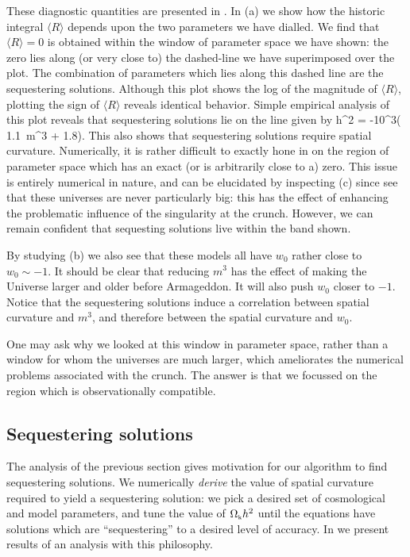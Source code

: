 \documentclass[amsmath,amssymb,10pt,twocolumn,eqsecnum]{revtex4}
\begin{document}
These diagnostic quantities are presented in . In (a) we show how the historic integral $\langle R\rangle$ depends upon the two parameters we have dialled. We find that $\langle R\rangle=0$ is obtained within the window of parameter space we have shown: the zero lies along (or very close to) the dashed-line we have superimposed over the plot. The combination of parameters which lies along this dashed line  are the sequestering solutions. Although this plot shows the log of the magnitude of $\langle R\rangle$, plotting the sign of $\langle R\rangle$ reveals identical behavior. Simple empirical analysis of this plot reveals that sequestering solutions lie on the line given by
\bea
{}h^2 = -10^3\left( 1.1\, m^3 + 1.8\right).
\eea
This also shows that sequestering solutions require spatial curvature. Numerically, it is rather difficult to exactly hone in on the region of parameter space which has an exact (or is arbitrarily close to a) zero. This issue is entirely numerical in nature, and can be elucidated by inspecting (c) since see that  these universes are never particularly big: this has the effect of enhancing the problematic influence of the singularity at the crunch. However, we can remain confident that sequesting solutions live within the band shown. 

By studying (b) we also see that these models all have $w_0$ rather close to $w_0 \sim -1$. It should be clear that reducing $m^3$ has the effect of making the Universe larger and older before Armageddon. It will also push $w_0$ closer to $-1$. Notice that the sequestering solutions induce a correlation between spatial curvature and $m^3$, and therefore between the spatial curvature and $w_0$.

One   may ask why we looked at this window in parameter space, rather than a window for whom the universes are much larger, which ameliorates the numerical problems associated with the crunch. The answer is that we focussed on the region which is observationally compatible.   
 
\subsection{Sequestering solutions}
The analysis of the previous section gives motivation for our algorithm to find sequestering solutions. We numerically \textit{derive} the value of spatial curvature required to yield a sequestering solution: we pick a desired set of cosmological and model parameters, and tune the value of ${\Omega}_{\scriptscriptstyle{\textrm{k}}}h^2$ until the equations have solutions which are  ``sequestering'' to a desired level of accuracy. In  we present results of an analysis with this philosophy.
\end{document}
